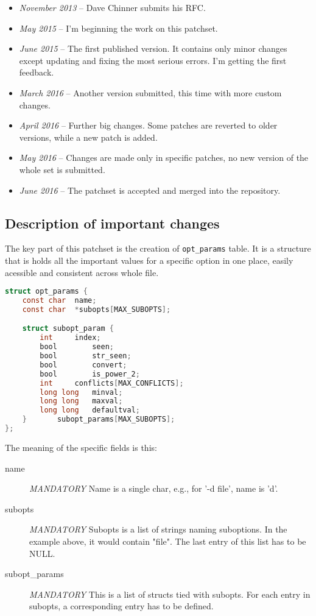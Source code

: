 \begin{itemize}
	\item {\em November 2013} -- Dave Chinner submits his RFC.
	\item {\em May 2015} -- I'm beginning the work on this patchset.
	\item {\em June 2015} -- The first published version. It contains
		only minor changes except updating and fixing the most
		serious errors. I'm getting the first feedback.
	\item {\em March 2016} -- Another version submitted, this time with
		more custom changes.
	\item {\em April 2016} -- Further big changes. Some patches are
		reverted to older versions, while a new patch is added.
	\item {\em May 2016} -- Changes are made only in specific patches,
		no new version of the whole set is submitted.
	\item {\em June 2016} -- The patchset is accepted and merged into
		the repository.
\end{itemize}

\subsection{Description of important changes}

The key part of this patchset is the creation of {\tt opt\_params} table.
It is a structure that is holds all the important values for a specific
option in one place, easily acessible and consistent across whole file.

\begin{lstlisting}[frame=none, basicstyle=\footnotesize\ttfamily,
language=C, numbers=none, numberstyle=\tiny\color{black},
caption= {Definition of the table.}]
struct opt_params {
	const char	name;
	const char	*subopts[MAX_SUBOPTS];

	struct subopt_param {
		int		index;
		bool		seen;
		bool		str_seen;
		bool		convert;
		bool		is_power_2;
		int		conflicts[MAX_CONFLICTS];
		long long	minval;
		long long	maxval;
		long long	defaultval;
	}		subopt_params[MAX_SUBOPTS];
};
\end{lstlisting}

The meaning of the specific fields is this:
\begin{description}
\item[name] {\em MANDATORY}
  Name is a single char, e.g., for '-d file', name is 'd'.

\item[subopts] {\em MANDATORY}
  Subopts is a list of strings naming suboptions. In the example above,
  it would contain "file". The last entry of this list has to be NULL.

\item[subopt\_params] {\em MANDATORY}
  This is a list of structs tied with subopts. For each entry in subopts,
  a corresponding entry has to be defined.
\end{description}


